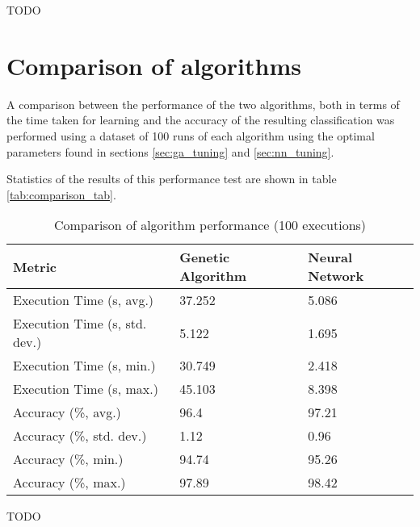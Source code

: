 \documentclass[a4paper]{article}
\begin{document}
TODO

\section{Comparison of algorithms}
\label{sec:comparison}

A comparison between the performance of the two algorithms, both in terms of the
time taken for learning and the accuracy of the resulting classification was
performed using a dataset of 100 runs of each algorithm using the optimal
parameters found in sections \ref{sec:ga_tuning} and \ref{sec:nn_tuning}.

Statistics of the results of this performance test are shown in table
\ref{tab:comparison_tab}.

\begin{table}[h!]
  \centering
  \begin{tabular}{@{}lll@{}}
    \toprule
    Metric                        & Genetic Algorithm & Neural Network \\
    \midrule
    Execution Time (s, avg.)      & 37.252            & 5.086          \\
    Execution Time (s, std. dev.) & 5.122             & 1.695          \\
    Execution Time (s, min.)      & 30.749            & 2.418          \\
    Execution Time (s, max.)      & 45.103            & 8.398          \\
    Accuracy (\%, avg.)           & 96.4              & 97.21          \\
    Accuracy (\%, std. dev.)      & 1.12              & 0.96           \\
    Accuracy (\%, min.)           & 94.74             & 95.26          \\
    Accuracy (\%, max.)           & 97.89             & 98.42          \\
    \bottomrule
  \end{tabular}
  \caption{Comparison of algorithm performance (100 executions)}
  \label{tab:comparison_avg}
\end{table}

TODO

\begin{thebibliography}{9}
\end{thebibliography}
\end{document}
